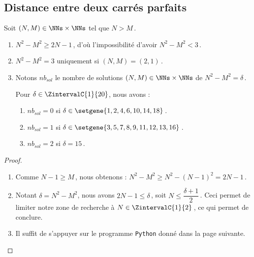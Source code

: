 \subsection{Distance entre deux carrés parfaits}

\begin{fact} \label{diff-square-ko}
	Soit $(N, M) \in \NNs \times \NNs$ tel que $N > M$\,.
	\begin{enumerate}
		\item $N^2 - M^2 \geq 2N - 1$\,, 
		d'où l'impossibilité d'avoir
		$N^2 - M^2 < 3$\,.
		
		\item $N^2 - M^2 = 3$ uniquement si $(N, M) = (2, 1)$\,.
		
		\item Notons $nb_{sol}$ le nombre de solutions $(N, M) \in \NNs \times \NNs$ de $N^2 - M^2 = \delta$\,.
				
		\smallskip
		\noindent
		Pour $\delta \in \ZintervalC{1}{20}$, nous avons :
		\begin{enumerate}
			\item $nb_{sol}= 0$ si $\delta \in \setgene{1, 2, 4, 6, 10, 14, 18}$\,.

			\item $nb_{sol}= 1$ si $\delta \in \setgene{3, 5, 7, 8, 9, 11, 12, 13, 16}$\,.

			\item $nb_{sol}= 2$ si $\delta = 15$\,.
		\end{enumerate}
	\end{enumerate}
\end{fact}


\begin{proof}
	\leavevmode
	
	\vspace{-1ex}
	\begin{enumerate}
		\item Comme $N - 1 \geq M$\,, nous obtenons :
		$N^2 - M^2 \geq N^2 - (N - 1)^2 = 2N - 1$\,.		

		\item Notant $\delta = N^2 - M^2$, nous avons $2 N - 1 \leq \delta$\,, soit $N  \leq \dfrac{\delta + 1}{2}$\,.
		Ceci permet de limiter notre zone de recherche à $N \in \ZintervalC{1}{2}$\,, ce qui permet de conclure.
		

		
		\item Il suffit de s'appuyer sur le programme \verb#Python# donné dans la page suivante.
		\qedhere
	\end{enumerate}
\end{proof}

